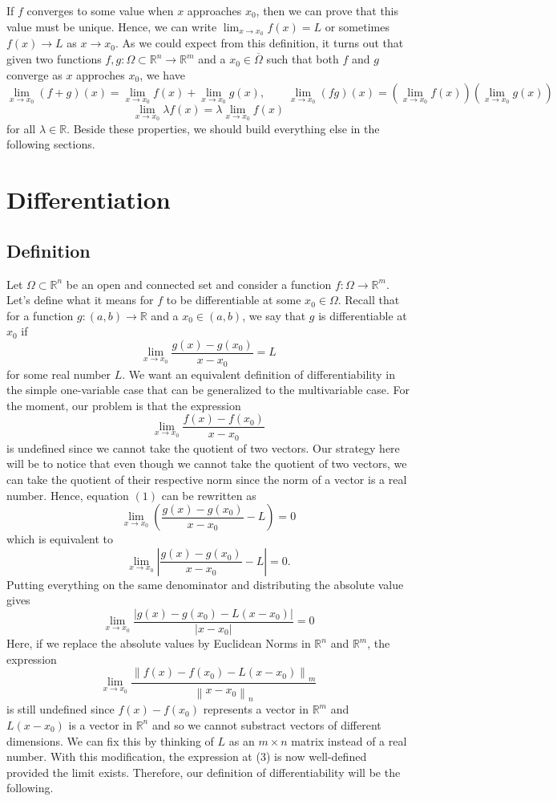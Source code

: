 \documentclass{article}
\theoremstyle{plain}
\theoremstyle{definition}
\newcommand{\R}{\mathbb{R}}
\newcommand{\lnorm}[2]{\left\lVert#2 \right\rVert_{#1}}
\begin{document}
If $f$ converges to some value when $x$ approaches $x_0$, then we can prove that this value must be unique. Hence, we can write $\lim_{x \rightarrow x_0}f(x) = L$ or sometimes $f(x) \rightarrow L$ as $x \rightarrow x_0$. As we could expect from this definition, it turns out that given two functions $f,g : \Omega \subset \R^n \to \R^m$ and a $x_0 \in \overline{\Omega}$ such that both $f$ and $g$ converge as $x$ approches $x_0$, we have 
$$\lim_{x \rightarrow x_0}(f+g)(x)= \lim_{x \rightarrow x_0}f(x) + \lim_{x \rightarrow x_0}g(x), \qquad \lim_{x \rightarrow x_0}(fg)(x) = (\lim_{x \rightarrow x_0}f(x)) (\lim_{x \rightarrow x_0}g(x))$$
$$\lim_{x \rightarrow x_0}\lambda f(x) = \lambda \lim_{x \rightarrow x_0}f(x)$$
for all $\lambda \in \R$. Beside these properties, we should build everything else in the following sections.

\section{Differentiation}

\subsection{Definition}

Let $\Omega \subset \R^n$ be an open and connected set and consider a function $f : \Omega \to \R^m$. Let's define what it means for $f$ to be differentiable at some $x_0 \in \Omega$. Recall that for a function $g : (a,b) \to \R$ and a $x_0 \in (a,b)$, we say that $g$ is differentiable at $x_0$ if 
\[\lim_{x \rightarrow x_0}\frac{g(x) - g(x_0)}{x-x_0} = L \tag*{(1)}\]
for some real number $L$. We want an equivalent definition of differentiability in the simple one-variable case that can be generalized to the multivariable case. For the moment, our problem is that the expression
$$\lim_{x \rightarrow x_0}\frac{f(x) - f(x_0)}{x-x_0}$$
is undefined since we cannot take the quotient of two vectors. Our strategy here will be to notice that even though we cannot take the quotient of two vectors, we can take the quotient of their respective norm since the norm of a vector is a real number. Hence, equation $(1)$ can be rewritten as
\[\lim_{x \rightarrow x_0}\left(\frac{g(x) - g(x_0)}{x-x_0} - L\right) = 0\]
which is equivalent to
\[\lim_{x \rightarrow x_0}\left|\frac{g(x) - g(x_0)}{x-x_0} - L\right| = 0.\]
Putting everything on the same denominator and distributing the absolute value gives 
\[\lim_{x \rightarrow x_0}\frac{|g(x) - g(x_0) - L(x - x_0)|}{|x-x_0|} = 0 \tag*{(2)}\]
Here, if we replace the absolute values by Euclidean Norms in $\R^n$ and $\R^m$, the expression
\[\lim_{x \rightarrow x_0}\frac{\lnorm{m}{f(x) - f(x_0) - L(x - x_0)}}{\lnorm{n}{x - x_0}} \tag*{(3)}\] 
is still undefined since $f(x) - f(x_0)$ represents a vector in $\R^m$ and $L(x - x_0)$ is a vector in $\R^n$ and so we cannot substract vectors of different dimensions. We can fix this by thinking of $L$ as an $m \times n$ matrix instead of a real number. With this modification, the expression at (3) is now well-defined provided the limit exists. Therefore, our definition of differentiability will be the following.
\end{document}
